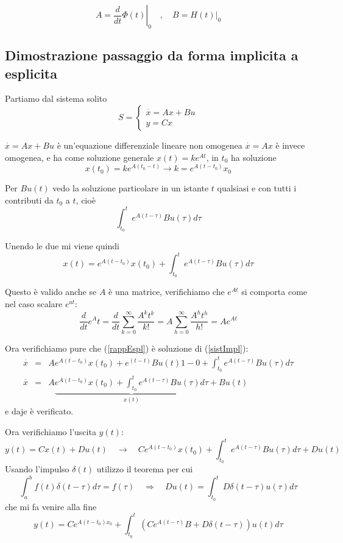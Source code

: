 \documentclass{article}
\begin{document}
\[ A = \left.\frac{d}{dt}\Phi(t)\right|_{0} \quad,\quad B = \left.H(t)\right|_{0} \]


\subsection{Dimostrazione passaggio da forma implicita a esplicita}

Partiamo dal sistema solito 
\begin{equation}\label{sistImpl}
    S = \begin{cases} \overset{\cdot}{x} = Ax+Bu\\ y = Cx \end{cases}
\end{equation}

$\overset{\cdot}{x} = Ax+Bu$ è un'equazione differenziale lineare non omogenea
$\overset{\cdot}{x} = Ax$ è invece omogenea, e ha come soluzione generale $x(t) = ke^{At}$,
in $t_0$ ha soluzione 
\[ x(t_0) = ke^{A(t_0-t)} \to k = e^{A(t-t_0)}x_0 \]

Per $Bu(t)$ vedo la soluzione particolare in un istante $t$ qualsiasi e con tutti i contributi da $t_0$ a $t$, cioè
\[ \int_{t_0}^{t}e^{A(t-\tau)}Bu(\tau)d\tau \]

Unendo le due mi viene quindi 
\begin{equation}\label{rappEspl}
    x(t) = e^{A(t-t_0)}x(t_0)+\int_{t_0}^{t}e^{A(t-\tau)}Bu(\tau)d\tau
\end{equation}

Questo è valido anche se $A$ è una matrice, verifichiamo che $e^{At}$ si comporta come nel caso
scalare $e^{at}$:
\[
\frac{d}{dt}e^At =     \frac{d}{dt}\sum_{k=0}^{\infty}\frac{A^kt^k}{k!} =
 A\sum_{h=0}^{\infty}\frac{A^ht^h}{h!} = Ae^{At}
\]

Ora verifichiamo pure che (\ref{rappEspl}) è soluzione di  (\ref{sistImpl}): 
\begin{align*}
    \overset{\cdot}{x} &=& Ae^{A(t-t_0)}x(t_0)+e^{(t-t)}B u(t) 1 - 0 + \int_{t_0}^{t}e^{A(t-\tau)}Bu(\tau)d\tau\\
    \overset{\cdot}{x} &=& A\underbrace{e^{A(t-t_0)}x(t_0)+ \int_{t_0}^{t}e^{A(t-\tau)}Bu(\tau)d\tau}_{x(t)}+Bu(t)
\end{align*}
e daje è verificato.


Ora verifichiamo l'uscita $y(t)$:
\[
y(t) =Cx(t)+Du(t) \quad \to\quad Ce^{A(t-t_0)}x(t_0)+    \int_{t_0}^{t}e^{A(t-\tau)}Bu(\tau)d\tau+Du(t)
\]
Usando l'impulso $\delta(t)$ utilizzo il teorema per cui
\[
\int_{a}^{b}f(t)\delta(t-\tau)d\tau = f(\tau) \quad\Longrightarrow\quad
Du(t) =   \int_{t_0}^{t} D\delta(t-\tau)u(\tau)d\tau
\]
che mi fa venire alla fine 
\[
    y(t) = Ce^{A(t-t_0)x_0}+\int_{t_0}^{t} \left(Ce^{A(t-\tau)}B+D\delta(t-\tau)\right)u(t)d\tau
\]
\end{document}
